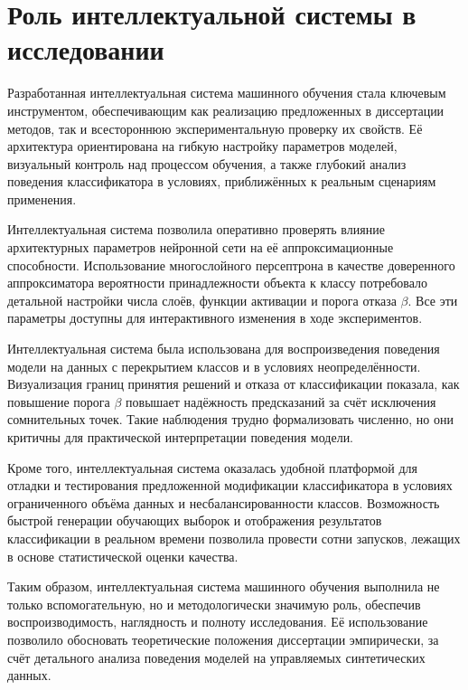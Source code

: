 \section{Роль интеллектуальной системы в исследовании}

Разработанная интеллектуальная система машинного обучения стала ключевым инструментом, обеспечивающим как реализацию предложенных в диссертации методов, так и всестороннюю экспериментальную проверку их свойств. Её архитектура ориентирована на гибкую настройку параметров моделей, визуальный контроль над процессом обучения, а также глубокий анализ поведения классификатора в условиях, приближённых к реальным сценариям применения.

Интеллектуальная система позволила оперативно проверять влияние архитектурных параметров нейронной сети на её аппроксимационные способности. Использование многослойного персептрона в качестве доверенного аппроксиматора вероятности принадлежности объекта к классу потребовало детальной настройки числа слоёв, функции активации и порога отказа \(\beta\). Все эти параметры доступны для интерактивного изменения в ходе экспериментов.

Интеллектуальная система была использована для воспроизведения поведения модели на данных с перекрытием классов и в условиях неопределённости. Визуализация границ принятия решений и отказа от классификации показала, как повышение порога \(\beta\) повышает надёжность предсказаний за счёт исключения сомнительных точек. Такие наблюдения трудно формализовать численно, но они критичны для практической интерпретации поведения модели.

Кроме того, интеллектуальная система оказалась удобной платформой для отладки и тестирования предложенной модификации классификатора в условиях ограниченного объёма данных и несбалансированности классов. Возможность быстрой генерации обучающих выборок и отображения результатов классификации в реальном времени позволила провести сотни запусков, лежащих в основе статистической оценки качества.

Таким образом, интеллектуальная система машинного обучения выполнила не только вспомогательную, но и методологически значимую роль, обеспечив воспроизводимость, наглядность и полноту исследования. Её использование позволило обосновать теоретические положения диссертации эмпирически, за счёт детального анализа поведения моделей на управляемых синтетических данных.
